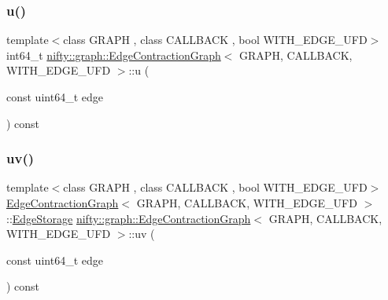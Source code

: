 \subsubsection{\texorpdfstring{u()}{u()}}
{\footnotesize\ttfamily template$<$class G\+R\+A\+PH , class C\+A\+L\+L\+B\+A\+CK , bool W\+I\+T\+H\+\_\+\+E\+D\+G\+E\+\_\+\+U\+FD$>$ \\
int64\+\_\+t \hyperlink{classnifty_1_1graph_1_1EdgeContractionGraph}{nifty\+::graph\+::\+Edge\+Contraction\+Graph}$<$ G\+R\+A\+PH, C\+A\+L\+L\+B\+A\+CK, W\+I\+T\+H\+\_\+\+E\+D\+G\+E\+\_\+\+U\+FD $>$\+::u (\begin{DoxyParamCaption}\item[{const uint64\+\_\+t}]{edge }\end{DoxyParamCaption}) const\hspace{0.3cm}{\ttfamily [inline]}}

\mbox{\label{classnifty_1_1graph_1_1EdgeContractionGraph_aa9f877c513e88e0fcb31ea57c0601b82}} 
\subsubsection{\texorpdfstring{uv()}{uv()}}
{\footnotesize\ttfamily template$<$class G\+R\+A\+PH , class C\+A\+L\+L\+B\+A\+CK , bool W\+I\+T\+H\+\_\+\+E\+D\+G\+E\+\_\+\+U\+FD$>$ \\
\hyperlink{classnifty_1_1graph_1_1EdgeContractionGraph}{Edge\+Contraction\+Graph}$<$ G\+R\+A\+PH, C\+A\+L\+L\+B\+A\+CK, W\+I\+T\+H\+\_\+\+E\+D\+G\+E\+\_\+\+U\+FD $>$\+::\hyperlink{classnifty_1_1graph_1_1EdgeContractionGraph_ad57e807f7df20892c7bbbb9b53d3aa08}{Edge\+Storage} \hyperlink{classnifty_1_1graph_1_1EdgeContractionGraph}{nifty\+::graph\+::\+Edge\+Contraction\+Graph}$<$ G\+R\+A\+PH, C\+A\+L\+L\+B\+A\+CK, W\+I\+T\+H\+\_\+\+E\+D\+G\+E\+\_\+\+U\+FD $>$\+::uv (\begin{DoxyParamCaption}\item[{const uint64\+\_\+t}]{edge }\end{DoxyParamCaption}) const\hspace{0.3cm}{\ttfamily [inline]}}

\mbox{\label{classnifty_1_1graph_1_1EdgeContractionGraph_a454f1714ad453fc12af7b688e1a65083}} 
